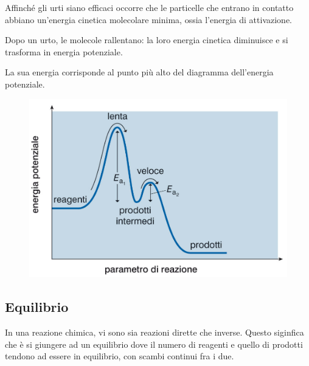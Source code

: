 \documentclass[a4paper]{article}
\begin{document}
Affinché gli urti siano efficaci occorre che le particelle che
entrano in contatto abbiano un'energia cinetica molecolare
minima, ossia l'energia di attivazione.

Dopo un urto, le molecole rallentano: la loro energia
cinetica diminuisce e si trasforma in energia potenziale.

\pagebreak


La sua energia corrisponde al punto più alto del diagramma dell'energia potenziale.

\begin{center}
\begin{figure}[th]
    \centering
    \includegraphics[width=\textwidth]{./reaction.png}
\end{figure}
\end{center}

\pagebreak

\subsection{Equilibrio}

In una reazione chimica, vi sono sia reazioni dirette che inverse.
Questo siginfica che è si giungere ad un equilibrio dove
il numero di reagenti e quello di prodotti tendono ad essere in equilibrio,
con scambi continui fra i due.
\end{document}
